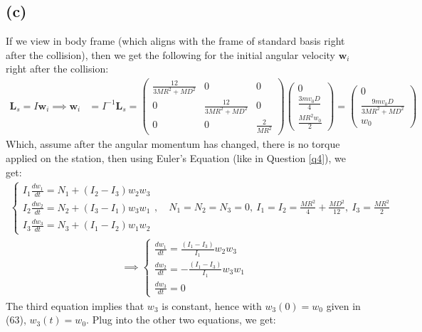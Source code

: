 \documentclass{article}
\newcommand{\bL}{\textbf{L}} %
\newcommand{\bw}{\textbf{w}} %
\begin{document}
\subsection*{(c)}
If we view in body frame (which aligns with the frame of standard basis right after the collision), then we get the following for the initial angular velocity $\bw_i$ right after the collision:
\begin{align}
    \bL_s = I\bw_i \implies \bw_i &= I^{-1}\bL_s = \begin{pmatrix}
        \frac{12}{3MR^2+MD^2}&0&0\\
        0&\frac{12}{3MR^2+MD^2}&0\\
        0&0&\frac{2}{MR^2}
    \end{pmatrix}\begin{pmatrix}
        0\\\frac{3mv_0D}{4}\\\frac{MR^2w_0}{2}
    \end{pmatrix} = \begin{pmatrix}
        0\\ \frac{9mv_0D}{3MR^2+MD^2}\\ w_0
    \end{pmatrix}
\end{align}
Which, assume after the angular momentum has changed, there is no torque applied on the station, then using Euler's Equation (like in Question \ref{q4}), we get:
\begin{align}
    \begin{cases}
        I_1\frac{dw_1}{dt}=N_1+(I_2-I_3)w_2w_3\\
        I_2\frac{dw_2}{dt}=N_2+(I_3-I_1)w_3w_1\\
        I_3\frac{dw_3}{dt}=N_3+(I_1-I_2)w_1w_2
    \end{cases}, \quad N_1=N_2=N_3=0,\ I_1=I_2 = \frac{MR^2}{4}+\frac{MD^2}{12},\ I_3 = \frac{MR^2}{2}
\end{align}
\begin{align}
    \implies \begin{cases}
        \frac{dw_1}{dt}=\frac{(I_1-I_3)}{I_1}w_2w_3\\
        \frac{dw_2}{dt}=-\frac{(I_1-I_3)}{I_1}w_3w_1\\
        \frac{dw_3}{dt}=0
    \end{cases}
\end{align}
The third equation implies that $w_3$ is constant, hence with $w_3(0)=w_0$ given in (63), $w_3(t)=w_0$. Plug into the other two equations, we get:
\end{document}
